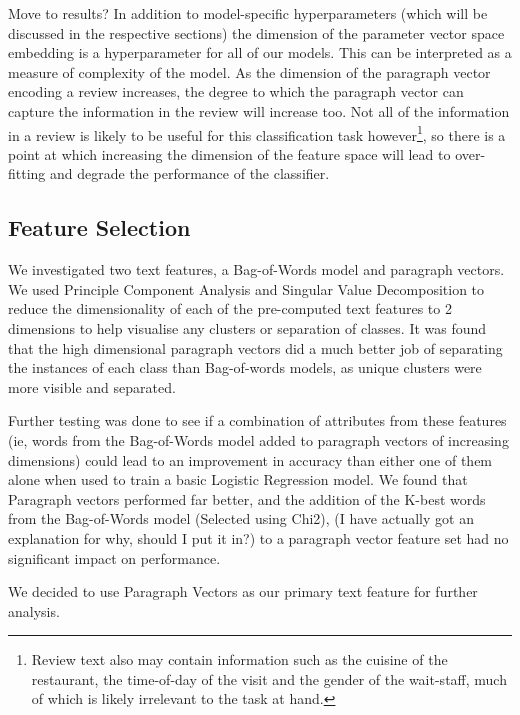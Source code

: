 \documentclass[11pt]{article}
\newcommand{\drafting}[1]{\textcolor{OliveGreen}{#1}}
\begin{document}
\drafting{Move to results?}
In addition to model-specific hyperparameters (which will be discussed in the respective sections) the dimension of the parameter vector space embedding is a hyperparameter for all of our models. This can be interpreted as a measure of complexity of the model. As the dimension of the paragraph vector encoding a review increases, the degree to which the paragraph vector can capture the information in the review will increase too. Not all of the information in a review is likely to be useful for this classification task however\footnote{Review text also may contain information such as the cuisine of the restaurant, the time-of-day of the visit and the gender of the wait-staff, much of which is likely irrelevant to the task at hand.}, so there is a point at which increasing the dimension of the feature space will lead to over-fitting and degrade the performance of the classifier.
\subsection{Feature Selection} \label{subsec:method-features}

We investigated two text features, a Bag-of-Words model and paragraph vectors. We used Principle Component Analysis and Singular Value Decomposition to reduce the dimensionality of each of the pre-computed text features to 2 dimensions to help visualise any clusters or separation of classes. It was found that the high dimensional paragraph vectors did a much better job of separating the instances of each class than Bag-of-words models, as unique clusters were more visible and separated.

Further testing was done to see if a combination of attributes from these features (ie, words from the Bag-of-Words model added to paragraph vectors of increasing dimensions) could lead to an improvement in accuracy than either one of them alone when used to train a basic Logistic Regression model. We found that Paragraph vectors performed far better, and the addition of the K-best words from the Bag-of-Words model (Selected using Chi2), \drafting{(I have actually got an explanation for why, should I put it in?)} to a paragraph vector feature set had no significant impact on performance.

We decided to use Paragraph Vectors as our primary text feature for further analysis.
\end{document}
